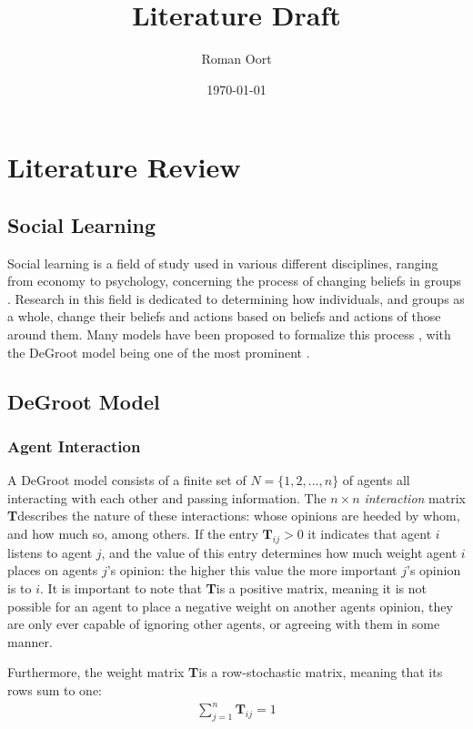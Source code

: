 \documentclass{article}
\title{Literature Draft}
\author{Roman Oort}
\date{\today}
\newcommand{\T}{\textbf{T}}
\newcommand{\Tij}{\textbf{T}_{ij}}
\begin{document}
\maketitle

\tableofcontents

\newpage

\section{Literature Review}
\subsection{Social Learning}
Social learning is a field of study used in various different disciplines, ranging from economy to psychology, concerning the process of changing beliefs in groups \cite{reed2010sociallearning}. Research in this field is dedicated to determining how individuals, and groups as a whole, change their beliefs and actions based on beliefs and actions of those around them. Many models have been proposed to formalize this process \cite{golub2017learning}, with the DeGroot model being one of the most prominent \cite{degroot1974concensus}.

\subsection{DeGroot Model}
\subsubsection{Agent Interaction}
A DeGroot model consists of a finite set of $N=\{1, 2, ..., n\}$ of agents all interacting with each other and passing information. The $n \times n$ \emph{interaction} matrix \T describes the nature of these interactions: whose opinions are heeded by whom, and how much so, among others. If the entry $\Tij > 0$ it indicates that agent $i$ listens to agent $j$, and the value of this entry determines how much weight agent $i$ places on agents $j$'s opinion: the higher this value the more important $j$'s opinion is to $i$. It is important to note that \T is a positive matrix, meaning it is not possible for an agent to place a negative weight on another agents opinion, they are only ever capable of ignoring other agents, or agreeing with them in some manner. 

Furthermore, the weight matrix \T is a row-stochastic matrix, meaning that its rows sum to one:
\begin{align*}
    \sum_{j=1}^{n} \Tij = 1
\end{align*}
\end{document}
